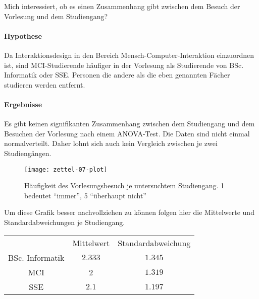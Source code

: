\documentclass[a4paper,10pt]{scrartcl}
\begin{document}
\kopf
\renewcommand{\figurename}{Figure}


Mich interessiert, ob es einen Zusammenhang gibt zwischen dem Besuch der Vorlesung und dem Studiengang?

\paragraph{Hypothese} Da Interaktionsdesign in den Bereich Mensch-Computer-Interaktion einzuordnen ist, sind MCI-Studierende häufiger in der Vorlesung als Studierende von BSc. Informatik oder SSE. Personen die andere als die eben genannten Fächer studieren werden entfernt.

\paragraph{Ergebnisse} Es gibt keinen signifikanten Zusammenhang zwischen dem Studiengang und dem Besuchen der Vorlesung nach einem ANOVA-Test. Die Daten sind nicht einmal normalverteilt. Daher lohnt sich auch kein Vergleich zwischen je zwei Studiengängen.

\begin{figure}[hb]
	\caption{Häufigkeit des Vorlesungsbesuch je untersuchtem Studiengang. 1 bedeutet "`immer"', 5 "`überhaupt nicht"'}
	\texttt{[image: zettel-07-plot]}
\end{figure}

Um diese Grafik besser nachvollziehen zu können folgen hier die Mittelwerte und Standardabweichungen je Studiengang.

\begin{tabular}{ccc}
	& Mittelwert & Standardabweichung \\
	BSc. Informatik & $2.333$ & $1.345$ \\
	MCI & 2 & $1.319$ \\
	SSE & $2.1$ & $1.197$ 
\end{tabular}
\end{document}
